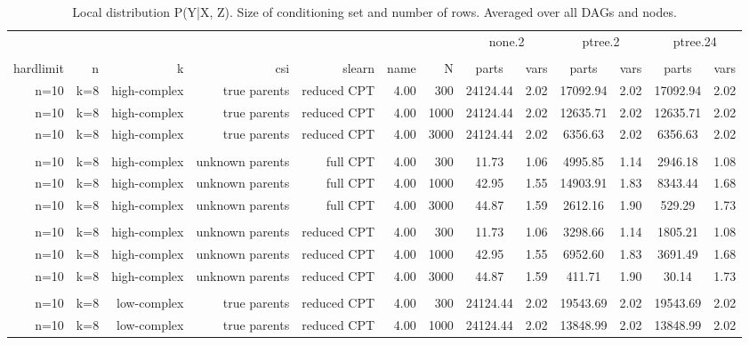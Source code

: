 \begin{table}[ht]
\centering
\caption{Local distribution P(Y|X, Z). Size of conditioning set and number of rows. Averaged over all DAGs and nodes.} 
\begin{tabular}{rrrrrrr|cc|cc|cc}
  \toprule
   & & & & & & &\multicolumn{2}{c}{none.2}&\multicolumn{2}{c}{ptree.2}&\multicolumn{2}{c}{ptree.24}   \\ 
 \cline{8-13}  \\ 
 hardlimit & n & k & csi & slearn & name & N & parts & vars & parts & vars & parts & vars  \\ 
 \midrule
n=10 & k=8 & high-complex & true parents & reduced CPT & 4.00 & 300 & 24124.44 & 2.02 & 17092.94 & 2.02 & 17092.94 & 2.02 \\ 
  n=10 & k=8 & high-complex & true parents & reduced CPT & 4.00 & 1000 & 24124.44 & 2.02 & 12635.71 & 2.02 & 12635.71 & 2.02 \\ 
  n=10 & k=8 & high-complex & true parents & reduced CPT & 4.00 & 3000 & 24124.44 & 2.02 & 6356.63 & 2.02 & 6356.63 & 2.02 \\ 
   \\ 
n=10 & k=8 & high-complex & unknown parents & full CPT & 4.00 & 300 & 11.73 & 1.06 & 4995.85 & 1.14 & 2946.18 & 1.08 \\ 
  n=10 & k=8 & high-complex & unknown parents & full CPT & 4.00 & 1000 & 42.95 & 1.55 & 14903.91 & 1.83 & 8343.44 & 1.68 \\ 
  n=10 & k=8 & high-complex & unknown parents & full CPT & 4.00 & 3000 & 44.87 & 1.59 & 2612.16 & 1.90 & 529.29 & 1.73 \\ 
   \\ 
n=10 & k=8 & high-complex & unknown parents & reduced CPT & 4.00 & 300 & 11.73 & 1.06 & 3298.66 & 1.14 & 1805.21 & 1.08 \\ 
  n=10 & k=8 & high-complex & unknown parents & reduced CPT & 4.00 & 1000 & 42.95 & 1.55 & 6952.60 & 1.83 & 3691.49 & 1.68 \\ 
  n=10 & k=8 & high-complex & unknown parents & reduced CPT & 4.00 & 3000 & 44.87 & 1.59 & 411.71 & 1.90 & 30.14 & 1.73 \\ 
   \\ 
n=10 & k=8 & low-complex & true parents & reduced CPT & 4.00 & 300 & 24124.44 & 2.02 & 19543.69 & 2.02 & 19543.69 & 2.02 \\ 
  n=10 & k=8 & low-complex & true parents & reduced CPT & 4.00 & 1000 & 24124.44 & 2.02 & 13848.99 & 2.02 & 13848.99 & 2.02 \\ 

\end{tabular}
\end{table}
